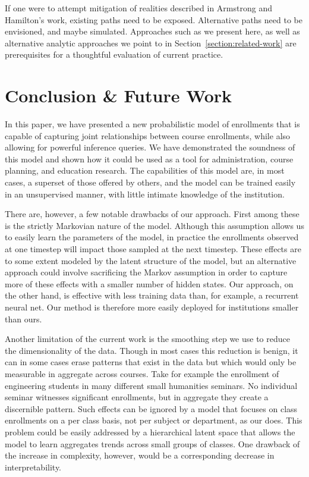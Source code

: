 \documentclass{edm_template}
\begin{document}
If one were to attempt mitigation of realities described in Armstrong and Hamilton's work, existing paths need to be exposed. Alternative
paths need to be envisioned, and maybe simulated. Approaches such as we present here, as well as alternative analytic approaches we point to in Section~\ref{section:related-work} are prerequisites for a thoughtful evaluation of current practice.

\section{Conclusion \& Future Work}

In this paper, we have presented a new probabilistic model of enrollments that is capable of capturing joint relationships between course enrollments, while also allowing for powerful inference queries. We have demonstrated the soundness of this model and shown how it could be used as a tool for administration, course planning, and education research. The capabilities of this model are, in most cases, a superset of those offered by others, and the model can be trained easily in an unsupervised manner, with little intimate knowledge of the institution. 

There are, however, a few notable drawbacks of our approach. First among these is the strictly Markovian nature of the model. Although this assumption allows us to easily learn the parameters of the model, in practice the enrollments observed at one timestep will impact those sampled at the next timestep. These effects are to some extent modeled by the latent structure of the model, but an alternative approach could involve sacrificing the Markov assumption in order to capture more of these effects with a smaller number of hidden states. Our approach, on the other hand, is effective with less training data than, for example, a recurrent neural net. Our method is therefore more easily deployed for institutions smaller than ours.

Another limitation of the current work is the smoothing step we use to reduce the dimensionality of the data. Though in most cases this reduction is benign, it can in some cases erase patterns that exist in the data but which would only be measurable in aggregate across courses. Take for example the enrollment of engineering students in many different small humanities seminars. No individual seminar witnesses significant enrollments, but in aggregate they create a discernible pattern. Such effects can be ignored by a model that focuses on class enrollments on a per class basis, not per subject or department, as our does. This problem could be easily addressed by a hierarchical latent space that allows the model to learn aggregates trends across small groups of classes. One drawback of the increase in complexity, however, would be a corresponding decrease in interpretability. 
\end{document}
